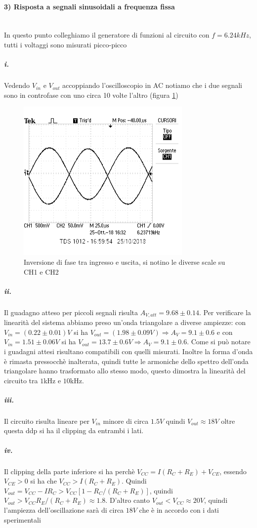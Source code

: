 \documentclass[10pt,a4paper]{article}
\begin{document}
\paragraph{3) Risposta a segnali sinusoidali a frequenza fissa} \mbox{}\\
In questo punto colleghiamo il generatore di funzioni al circuito con $f=6.24kHz$, tutti i voltaggi sono misurati picco-picco
\subparagraph{i.}
Vedendo $V_{in}$ e $V_{out}$ accoppiando l'oscilloscopio in AC notiamo che i due segnali sono in controfase con uno circa 10 volte l'altro (figura \ref{screen})
\begin{figure}
\centering
\includegraphics[scale=1]{3_1.png}
\caption{Inversione di fase tra ingresso e uscita, si notino le diverse scale su CH1 e CH2}
\label{screen} 
\end{figure}

\subparagraph{ii.}
Il guadagno atteso per piccoli segnali risulta $A_{V,att}=9.68\pm0.14$. Per verificare la linearità del sistema abbiamo preso un'onda triangolare a diverse ampiezze: con $V_{in} = (0.22\pm0.01)V$ si ha $V_{out} = (1.98\pm0.09V) \Longrightarrow A_V=9.1\pm0.6$ e con $V_{in} = 1.51\pm0.06V$ si ha $V_{out} = 13.7\pm0.6V \Longrightarrow A_V=9.1\pm0.6$. Come si può notare i guadagni attesi risultano compatibili con quelli misurati.\newline
Inoltre la forma d'onda è rimasta pressocchè inalterata, quindi tutte le armoniche dello spettro dell'onda triangolare hanno trasformato allo stesso modo, questo dimostra la linearità del circuito tra $1$kHz e $10$kHz.\newline
\subparagraph{iii.}
Il circuito risulta lineare per $V_{in}$ minore di circa $1.5 V$ quindi $V_{out} \approx 18 V$ oltre questa ddp si ha il clipping da entrambi i lati.
\subparagraph{iv.}
Il clipping della parte inferiore si ha perchè $V_{CC}=I(R_C+R_E)+V_{CE}$, essendo $V_{CE}>0$ si ha che $V_{CC}>I(R_C+R_E)$. Quindi $V_{out}=V_{CC}-IR_C>V_{CC}[1-R_C/(R_C+R_E)]$, quindi $V_{out}>V_{CC}R_E/(R_C+R_E)\approx 1.8$.\newline
D'altro canto $V_{out}<V_{CC}\approx 20V$, quindi l'ampiezza dell'oscillazione sarà di circa $18V$ che è in accordo con i dati sperimentali	
\end{document}
